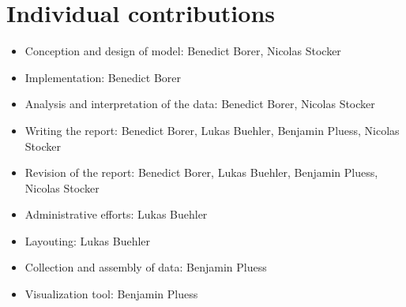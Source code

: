 \documentclass[11pt]{article}
\begin{document}
\section{Individual contributions}



\begin{itemize}
\item Conception and design of model: Benedict Borer, Nicolas Stocker
\item Implementation: Benedict Borer
\item Analysis and interpretation of the data: Benedict Borer, Nicolas Stocker
\item Writing the report: Benedict Borer, Lukas Buehler, Benjamin Pluess,  Nicolas Stocker
\item Revision of the report: Benedict Borer, Lukas Buehler, Benjamin Pluess,  Nicolas Stocker
\item Administrative efforts: Lukas Buehler
\item Layouting: Lukas Buehler
\item Collection and assembly of data: Benjamin Pluess
\item Visualization tool: Benjamin Pluess
\end{itemize}
\end{document}
